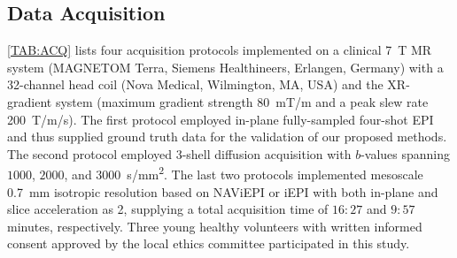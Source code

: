 \documentclass[journal,twoside,web]{ieeecolor}
\begin{document}
	\subsection{Data Acquisition}

	\cref{TAB:ACQ} lists four acquisition protocols implemented on
	a clinical \SI{7}{\tesla} MR system
	(MAGNETOM Terra, Siemens Healthineers, Erlangen, Germany)
	with a 32-channel head coil (Nova Medical, Wilmington, MA, USA)
	and the XR-gradient system
	(maximum gradient strength \SI{80}{\milli\tesla/\meter} and
	a peak slew rate \SI{200}{\tesla/\meter/\second}).
	The first protocol employed in-plane fully-sampled four-shot EPI
	and thus supplied ground truth data for the validation
	of our proposed methods.
	The second protocol employed 3-shell diffusion acquisition
	with $b$-values spanning $1000$, $2000$, and $3000$~\si{s/mm^2}.
	The last two protocols implemented mesoscale \SI{0.7}{mm}
	isotropic resolution based on NAViEPI or iEPI
	with both in-plane and slice acceleration as 2,
	supplying a total acquisition time of $16:27$ and $9:57$ minutes, respectively.
	Three young healthy volunteers with written informed consent
	approved by the local ethics committee
	participated in this study.


%
%
\end{document}
